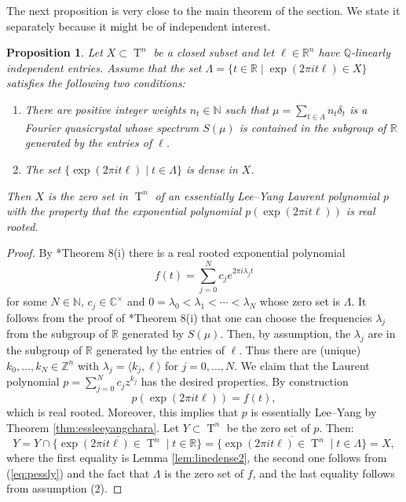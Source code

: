 \documentclass[11pt,letterpaper]{amsart}
\theoremstyle{definition}
\theoremstyle{plain}
\newtheorem{prop}[Def]{Proposition}
\newcommand{\T}{\operatorname{T}}
\newcommand{\C}{{\mathbb C}}
\newcommand{\R}{{\mathbb R}}
\newcommand{\Q}{{\mathbb Q}}
\newcommand{\N}{{\mathbb N}}
\newcommand{\Z}{{\mathbb Z}}
\begin{document}
The next proposition is very close to the main theorem of the section. We state it separately because it might be of independent interest.

\begin{prop}\label{prop:nosmoothness}
  Let $X\subset\T^n$ be a closed subset and let $\ell\in\R^n$ have $\Q$-linearly independent entries. Assume that the set $\Lambda=\{t\in\R\mid\exp(2\pi i t\ell)\in X\}$ satisfies the following two conditions:
  \begin{enumerate}
   \item There are positive integer weights $n_t\in\N$ such that $\mu=\sum_{t\in\Lambda}n_t\delta_t$ is a Fourier quasicrystal whose spectrum $S(\mu)$ is contained in the subgroup of $\R$ generated by the entries of $\ell$.
   \item The set $\{\exp(2\pi i t\ell)\mid t\in\Lambda\}$ is dense in $X$.
  \end{enumerate}
  Then $X$ is the zero set in $\T^n$ of an essentially Lee--Yang Laurent polynomial $p$ with the property that the exponential polynomial $p(\exp(2\pi i t\ell))$ is real rooted.
\end{prop}
\begin{proof}
    By \cite{olevskii2020fourier}*{Theorem 8(i)} there is a real rooted exponential polynomial
    \begin{equation*}
        f(t)=\sum_{j=0}^Nc_je^{2\pi i \lambda_jt}
    \end{equation*}
    for some $N\in\N$, $c_j\in\C^\times$ and $0=\lambda_0<\lambda_1<\cdots<\lambda_N$ whose zero set is $\Lambda$. 
    It follows from the proof of \cite{olevskii2020fourier}*{Theorem 8(i)} that one can choose the frequencies $\lambda_j$ from the subgroup of $\R$ generated by $S(\mu)$. Then, by assumption, the $\lambda_j$ are in the subgroup of $\R$ generated by the entries of $\ell$. Thus there are (unique) $k_0,\ldots,k_N\in\Z^n$ with $\lambda_j=\langle k_j,\ell\rangle$ for $j=0,\ldots,N$.  We claim that the Laurent polynomial $p=\sum_{j=0}^Nc_jz^{k_j}$ has the desired properties. By construction
    \begin{equation}\label{eq:pessly}
        p(\exp(2\pi i t\ell))=f(t),
    \end{equation}
    which is real rooted. Moreover, this implies that $p$ is essentially Lee--Yang by Theorem \ref{thm:essleeyangchara}. Let $Y\subset\T^n$ be the zero set of $p$. Then:
    \begin{equation*}
        Y=\overline{Y\cap\{\exp(2\pi i t\ell)\in\T^n\mid t\in\R\}}=\overline{\{\exp(2\pi i t\ell)\in\T^n\mid t\in\Lambda\}}=X,
    \end{equation*}
    where the first equality is Lemma \ref{lem:linedense2}, the second one follows from (\ref{eq:pessly}) and the fact that $\Lambda$ is the zero set of $f$, and the last equality follows from assumption (2).
\end{proof}
\end{document}
